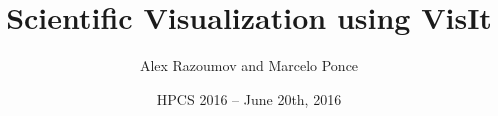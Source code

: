 \documentclass[dvipsnames]{beamer}
\begin{document}
\title[VisIt Workshop]{\Large\bf Scientific Visualization using VisIt}
\author[\textbf{A.Razoumov} \& \textbf{M.Ponce}]{\Large Alex Razoumov and Marcelo Ponce}
\date[HPCS 2016]{HPCS 2016 -- June 20th, 2016}

\begin{frame}
  \titlepage
\end{frame}
\end{document}

